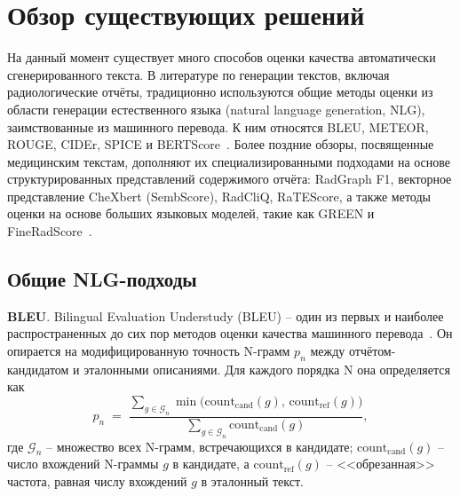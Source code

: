 
\section{Обзор существующих решений}



На данный момент существует много способов оценки качества автоматически сгенерированного текста. В литературе по генерации текстов, включая радиологические отчёты, традиционно используются общие методы оценки из области генерации естественного языка (natural language generation, NLG), заимствованные из машинного перевода. К ним относятся BLEU, METEOR, ROUGE, CIDEr, SPICE и BERTScore~\cite{papineni2002bleu,banerjee2005meteor,lin2004rouge,vedantam2015cider,anderson2016spice,zhang2020bertscore}. Более поздние обзоры, посвященные медицинским текстам, дополняют их специализированными подходами на основе структурированных представлений содержимого отчёта: RadGraph F1, векторное представление CheXbert (SembScore), RadCliQ, RaTEScore, а также методы оценки на основе больших языковых моделей, такие как GREEN и FineRadScore~\cite{yu2023evaluating, smit-etal-2020-combining, jain2021radgraph,ostmeier2024green,pmlr-v252-huang24a, zhao2024ratescore}.

\subsection{Общие NLG-подходы}
\textbf{BLEU}. Bilingual Evaluation Understudy (BLEU) -- один из первых и наиболее распространенных до сих пор методов оценки качества машинного перевода~\cite{papineni2002bleu}. Он опирается на модифицированную точность N-грамм $p_n$ между отчётом-кандидатом и эталонными описаниями. Для каждого порядка N она определяется как
\[
p_n \;=\; \frac{\sum\limits_{g \in \mathcal{G}_n} \min\!\bigl(\mathrm{count}_{\mathrm{cand}}(g),\, \mathrm{count}_{\mathrm{ref}}(g)\bigr)}{\sum\limits_{g \in \mathcal{G}_n} \mathrm{count}_{\mathrm{cand}}(g)},
\]
где $\mathcal{G}_n$ -- множество всех N-грамм, встречающихся в кандидате; $\mathrm{count}_{\mathrm{cand}}(g)$ -- число вхождений N-граммы $g$ в кандидате, а $\mathrm{count}_{\mathrm{ref}}(g)$ -- <<обрезанная>> частота, равная числу вхождений $g$ в эталонный текст.

